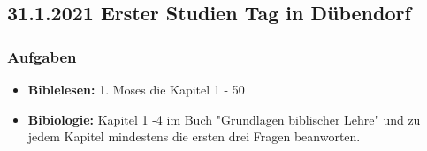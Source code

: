 \subsection{31.1.2021 Erster Studien Tag in Dübendorf}
\subsubsection{Aufgaben}
\begin{itemize}
    \item \textbf{Biblelesen:} 1. Moses die Kapitel 1 - 50
    \item \textbf{Bibiologie:} Kapitel 1 -4 im Buch "Grundlagen biblischer Lehre" 
    \cite{bibli:1} und zu jedem Kapitel mindestens die ersten drei Fragen beanworten. 
\end{itemize}
